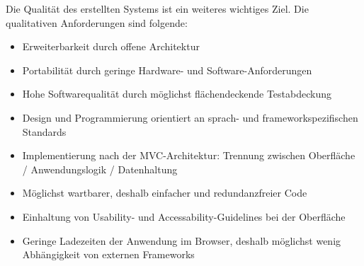 Die Qualität des erstellten Systems ist ein weiteres wichtiges Ziel. Die qualitativen Anforderungen sind folgende:

\begin{itemize}  
  \item Erweiterbarkeit durch offene Architektur
  \item Portabilität durch geringe Hardware- und Software-Anforderungen
  \item Hohe Softwarequalität durch möglichst flächendeckende Testabdeckung
  \item Design und Programmierung orientiert an sprach- und frameworkspezifischen Standards
  \item Implementierung nach der MVC-Architektur: Trennung zwischen Oberfläche / Anwendungslogik / Datenhaltung
  \item Möglichst wartbarer, deshalb einfacher und redundanzfreier Code
  \item Einhaltung von Usability- und Accessability-Guidelines bei der Oberfläche
  \item Geringe Ladezeiten der Anwendung im Browser, deshalb möglichst wenig Abhängigkeit von externen Frameworks
\end{itemize}

